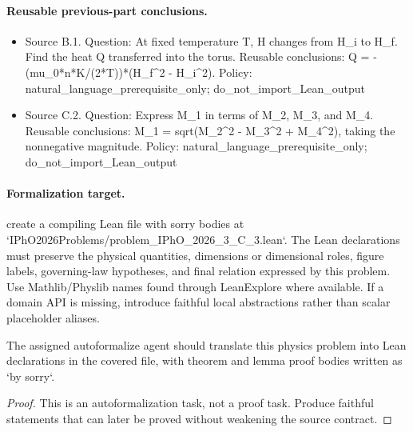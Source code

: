 \paragraph{Reusable previous-part conclusions.}
\begin{itemize}
\item Source B.1. Question: At fixed temperature T, H changes from H\_i to H\_f. Find the heat Q transferred into the torus. Reusable conclusions: Q = -(mu\_0*n*K/(2*T))*(H\_f\textasciicircum{}2 - H\_i\textasciicircum{}2). Policy: natural\_language\_prerequisite\_only; do\_not\_import\_Lean\_output
\item Source C.2. Question: Express M\_1 in terms of M\_2, M\_3, and M\_4. Reusable conclusions: M\_1 = sqrt(M\_2\textasciicircum{}2 - M\_3\textasciicircum{}2 + M\_4\textasciicircum{}2), taking the nonnegative magnitude. Policy: natural\_language\_prerequisite\_only; do\_not\_import\_Lean\_output
\end{itemize}

\paragraph{Formalization target.}
create a compiling Lean file with sorry bodies at `IPhO2026Problems/problem\_IPhO\_2026\_3\_C\_3.lean`.
The Lean declarations must preserve the physical quantities, dimensions or dimensional roles, figure labels, governing-law hypotheses, and final relation expressed by this problem.
Use Mathlib/Physlib names found through LeanExplore where available. If a domain API is missing, introduce faithful local abstractions rather than scalar placeholder aliases.

\begin{theorem}
\label{thm:physics:IPhO_2026_3_C_3:target}
The assigned autoformalize agent should translate this physics problem into Lean declarations in the covered file, with theorem and lemma proof bodies written as `by sorry`.
\end{theorem}
\begin{proof}
This is an autoformalization task, not a proof task. Produce faithful statements that can later be proved without weakening the source contract.
\end{proof}


